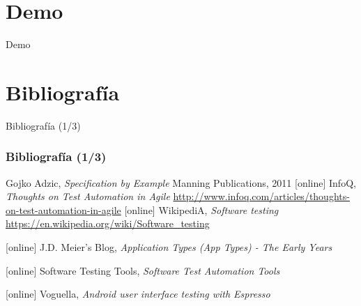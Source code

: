 \documentclass[pdf]
{beamer}
\begin{document}
    \section{Demo}
    \begin{frame}
      \begin{center}
      \Huge{Demo}
      \end{center}
    \end{frame}

    

    
    \section{Bibliograf\'ia}
    \begin{frame}{Bibliograf\'ia (1/3)}
      \frametitle<presentation>{Bibliograf\'ia (1/3)}
      
      \begin{thebibliography}{10}    

      \beamertemplatebookbibitems
	  Gojko Adzic, {\em Specification by Example}
	  \newblock Manning Publications, 2011
      [online]
	  InfoQ, {\em Thoughts on Test Automation in Agile}
	  \newblock \small{\href{http://www.infoq.com/articles/thoughts-on-test-automation-in-agile}{http://www.infoq.com/articles/thoughts-on-test-automation-in-agile}}
      [online]
	  WikipediA, {\em Software testing}
	  \newblock \href{https://en.wikipedia.org/wiki/Software\_testing}{https://en.wikipedia.org/wiki/Software\_testing}
	  
      [online]
	  J.D. Meier's Blog, {\em Application Types (App Types) - The Early Years}
      
      [online]
	  Software Testing Tools, {\em Software Test Automation Tools}
      

      [online]
	  Voguella, {\em Android user interface testing with Espresso}
	  
      \end{thebibliography}
      
    \end{frame}
    
\end{document}
